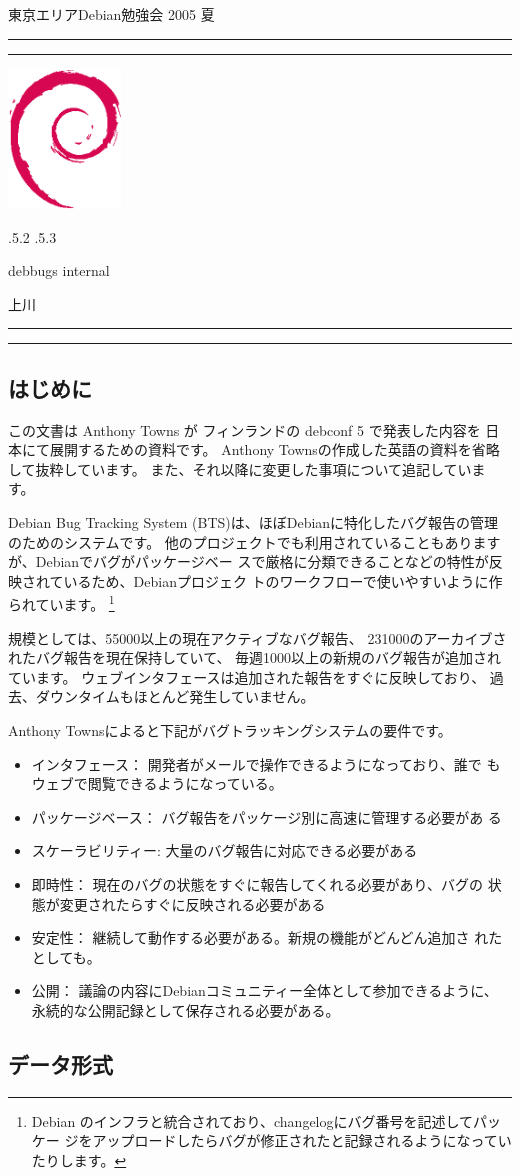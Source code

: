 \documentclass[mingoth,a4paper]{jsarticle}
\makeatletter
\renewcommand{\section}{\@startsection{section}{1}{\z@}%
    {\Cvs \@plus.5\Cdp \@minus.2\Cdp}%
    {.5\Cvs \@plus.3\Cdp}%
    {\normalfont\Large\headfont\raggedright\centering}} %
\newcommand{\dancersection}[2]{%
\newpage
東京エリアDebian勉強会 2005 夏
\hrule
\vspace{0.5mm}
\hrule
\hfill{}\includegraphics[width=3cm]{image200502/openlogo-nd.eps}\\
\vspace{-4cm}
\begin{center}
  \section{#1}
\end{center}
\hfill{}#2\hspace{3cm}\space\\
\hrule
\hrule
\vspace{1cm}
}
\makeatother
\begin{document}

\dancersection{debbugs internal}{上川}
\label{sec:uekawa}
\subsection{はじめに}

この文書は Anthony Towns が フィンランドの debconf 5 で発表した内容を
日本にて展開するための資料です。
Anthony Townsの作成した英語の資料を省略して抜粋しています。
また、それ以降に変更した事項について追記しています。

Debian Bug Tracking System (BTS)は、ほぼDebianに特化したバグ報告の管理
のためのシステムです。
他のプロジェクトでも利用されていることもありますが、Debianでバグがパッケージベー
スで厳格に分類できることなどの特性が反映されているため、Debianプロジェク
トのワークフローで使いやすいように作られています。
\footnote{Debian のインフラと統合されており、changelogにバグ番号を記述してパッケー
ジをアップロードしたらバグが修正されたと記録されるようになっていたりします。}

規模としては、55000以上の現在アクティブなバグ報告、
231000のアーカイブされたバグ報告を現在保持していて、
毎週1000以上の新規のバグ報告が追加されています。
ウェブインタフェースは追加された報告をすぐに反映しており、
過去、ダウンタイムもほとんど発生していません。

Anthony Townsによると下記がバグトラッキングシステムの要件です。

\begin{itemize}
 \item インタフェース： 開発者がメールで操作できるようになっており、誰で
       もウェブで閲覧できるようになっている。
 \item パッケージベース： バグ報告をパッケージ別に高速に管理する必要があ
       る
 \item スケーラビリティー: 大量のバグ報告に対応できる必要がある
 \item 即時性： 現在のバグの状態をすぐに報告してくれる必要があり、バグの
       状態が変更されたらすぐに反映される必要がある
 \item 安定性： 継続して動作する必要がある。新規の機能がどんどん追加さ
       れたとしても。
 \item 公開： 議論の内容にDebianコミュニティー全体として参加できるように、
       永続的な公開記録として保存される必要がある。
\end{itemize}

\subsection{データ形式}
\end{document}
